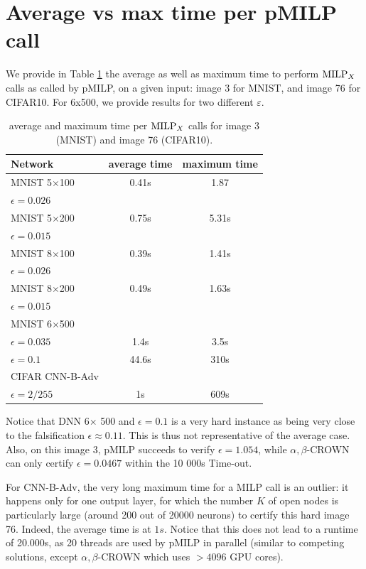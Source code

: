\section{Average vs max time per pMILP call}

We provide in Table \ref{table112} the average as well as maximum time to perform ${\textrm{MILP}}_X$ calls as called by pMILP, on a given input: image 3 for MNIST, and image 76 for CIFAR10. 
For 6x500, we provide results for two different $\varepsilon$.


\begin{table}[h!]
	\centering
	\begin{tabular}{||l|c|c||}
		\hline
		Network & average time & maximum time \\ \hline
		MNIST 5$\times$100 & 0.41s & 1.87 \\
		$\epsilon = 0.026$ &  & \\  \hline
		MNIST 5$\times$200 &  0.75s & 5.31s \\ 
		$\epsilon = 0.015$ & & \\  \hline
		MNIST 8$\times$100 & 0.39s & 1.41s \\
		$\epsilon = 0.026$ & &  \\  \hline
		MNIST 8$\times$200 & 0.49s & 1.63s \\ 
		$\epsilon = 0.015$ & & \\  \hline
		MNIST 6$\times$500 & &   \\ 
		$\epsilon = 0.035$ & 1.4s & 3.5s \\ 
		$\epsilon = 0.1$ & 44.6s & 310s \\  \hline 
		CIFAR CNN-B-Adv &  & \\
		$\epsilon = 2/255$& 1s & 609s \\ \hline \hline
	\end{tabular}
	\caption{average and maximum time per ${\textrm{MILP}}_X$ calls for image 3 (MNIST) and image 76 (CIFAR10).}
	\label{table112}
\end{table}

Notice that DNN 6$\times$ 500 and $\epsilon=0.1$ is a very hard instance as being very close to the falsification $\epsilon \approx 0.11$. This is thus not representative of the average case. Also,  on this image 3, pMILP succeeds to verify $\epsilon= 1.054$, while $\alpha,\beta$-CROWN can only certify $\epsilon = 0.0467$ within the 10 000s Time-out.

For CNN-B-Adv, the very long maximum time for a MILP call is an outlier: it happens only for one output layer, for which the number $K$ of open nodes is particularly large (around 200 out of 20000 neurons) to certify this hard image 76. Indeed, the average time is at $1s$. Notice that this does not lead to a runtime of 20.000s, as 20 threads are used by pMILP 
in parallel (similar to competing solutions, except $\alpha,\beta$-CROWN which uses $>4096$ GPU cores).



